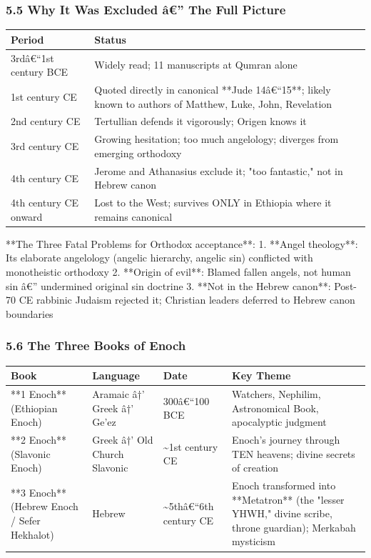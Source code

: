 \documentclass[aps,prd,11pt,onecolumn,superscriptaddress,nofootinbib,floatfix]{revtex4-2}
\begin{document}
\subsubsection{5.5 Why It Was Excluded â€'' The Full Picture}


\begin{table}[h!]
\centering
\begin{tabular}{p{3cm}p{3cm}}
\hline
Period & Status \\
\hline
3rdâ€``1st century BCE & Widely read; 11 manuscripts at Qumran alone \\
1st century CE & Quoted directly in canonical **Jude 14â€``15**; likely known to authors of Matthew, Luke, John, Revelation \\
2nd century CE & Tertullian defends it vigorously; Origen knows it \\
3rd century CE & Growing hesitation; too much angelology; diverges from emerging orthodoxy \\
4th century CE & Jerome and Athanasius exclude it; "too fantastic," not in Hebrew canon \\
4th century CE onward & Lost to the West; survives ONLY in Ethiopia where it remains canonical \\
\hline
\end{tabular}
\end{table}



**The Three Fatal Problems for Orthodox acceptance**:
1. **Angel theology**: Its elaborate angelology (angelic hierarchy, angelic sin) conflicted with monotheistic orthodoxy
2. **Origin of evil**: Blamed fallen angels, not human sin â€'' undermined original sin doctrine
3. **Not in the Hebrew canon**: Post-70 CE rabbinic Judaism rejected it; Christian leaders deferred to Hebrew canon boundaries


\subsubsection{5.6 The Three Books of Enoch}


\begin{table}[h!]
\centering
\begin{tabular}{p{3cm}p{3cm}p{3cm}p{3cm}}
\hline
Book & Language & Date & Key Theme \\
\hline
**1 Enoch** (Ethiopian Enoch) & Aramaic â†' Greek â†' Ge'ez & 300â€``100 BCE & Watchers, Nephilim, Astronomical Book, apocalyptic judgment \\
**2 Enoch** (Slavonic Enoch) & Greek â†' Old Church Slavonic & \textasciitilde{}1st century CE & Enoch's journey through TEN heavens; divine secrets of creation \\
**3 Enoch** (Hebrew Enoch / Sefer Hekhalot) & Hebrew & \textasciitilde{}5thâ€``6th century CE & Enoch transformed into **Metatron** (the "lesser YHWH," divine scribe, throne guardian); Merkabah mysticism \\
\hline
\end{tabular}
\end{table}
\end{document}

